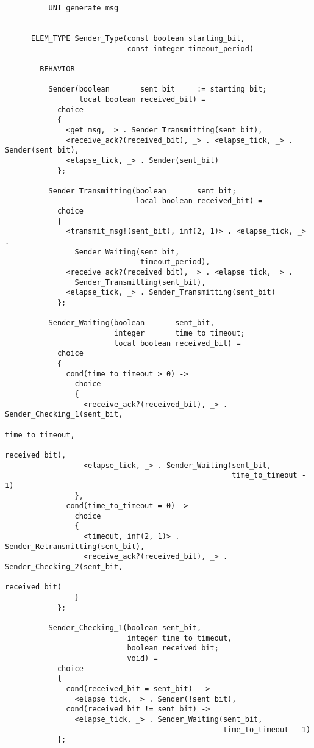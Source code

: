 \begin{verbatim}
          UNI generate_msg


      ELEM_TYPE Sender_Type(const boolean starting_bit,
                            const integer timeout_period)

        BEHAVIOR

          Sender(boolean       sent_bit     := starting_bit;
                 local boolean received_bit) =
            choice
            {
              <get_msg, _> . Sender_Transmitting(sent_bit),
              <receive_ack?(received_bit), _> . <elapse_tick, _> . Sender(sent_bit),
              <elapse_tick, _> . Sender(sent_bit)
            };

          Sender_Transmitting(boolean       sent_bit;
                              local boolean received_bit) =
            choice
            {
              <transmit_msg!(sent_bit), inf(2, 1)> . <elapse_tick, _> .
                Sender_Waiting(sent_bit,
                               timeout_period),
              <receive_ack?(received_bit), _> . <elapse_tick, _> .
                Sender_Transmitting(sent_bit),
              <elapse_tick, _> . Sender_Transmitting(sent_bit)
            };

          Sender_Waiting(boolean       sent_bit,
                         integer       time_to_timeout;
                         local boolean received_bit) =
            choice
            {
              cond(time_to_timeout > 0) ->
                choice
                {
                  <receive_ack?(received_bit), _> . Sender_Checking_1(sent_bit,
                                                                      time_to_timeout,
                                                                      received_bit),
                  <elapse_tick, _> . Sender_Waiting(sent_bit,
                                                    time_to_timeout - 1)
                },
              cond(time_to_timeout = 0) ->
                choice
                {
                  <timeout, inf(2, 1)> . Sender_Retransmitting(sent_bit),
                  <receive_ack?(received_bit), _> . Sender_Checking_2(sent_bit,
                                                                      received_bit)
                }
            };

          Sender_Checking_1(boolean sent_bit,
                            integer time_to_timeout,
                            boolean received_bit;
                            void) =
            choice
            {
              cond(received_bit = sent_bit)  ->
                <elapse_tick, _> . Sender(!sent_bit),
              cond(received_bit != sent_bit) ->
                <elapse_tick, _> . Sender_Waiting(sent_bit,
                                                  time_to_timeout - 1)
            };


\end{verbatim}
